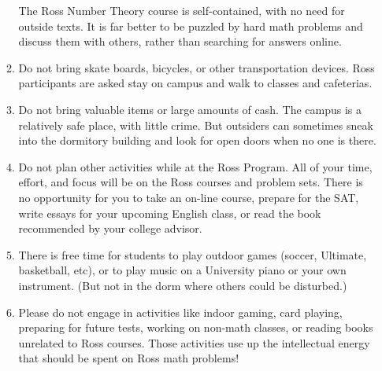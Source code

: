 \documentclass[11pt]{ross}
\begin{document}
\begin{enumerate}[label=(\arabic*),itemsep=2em,topsep=-1em]
\begin{enumerate}[label=(\alph*),itemsep=0.5em,topsep=0em]
    The Ross Number Theory course is self-contained, with no need for 
    outside texts.  It is far better to be puzzled by hard math problems 
    and discuss them with others, rather than searching for answers online.
  \item Do not bring skate boards, bicycles, or other transportation devices.
    Ross participants are asked stay on campus and walk to classes and cafeterias. 
  \item Do not bring valuable items or large amounts of cash.  The
    campus is a relatively safe place, with little crime.  But
    outsiders can sometimes sneak into the dormitory building and look
    for open doors when no one is there.
  \item Do not plan other activities while at the Ross Program. All of 
    your time, effort, and focus will be on the Ross courses and problem 
    sets.  There is no opportunity for you to take an on-line course, 
    prepare for the SAT, write essays for your upcoming English 
    class, or read the book recommended by your college advisor.
  \item There is free time for students to play outdoor games (soccer, Ultimate, 
    basketball, etc), or to play music on a University piano or your own 
    instrument. (But not in the dorm where others could be disturbed.)
   \item Please do not engage in activities like indoor gaming, card playing, 
    preparing for future tests, working on non-math classes, or reading books 
    unrelated to Ross courses. Those activities use up
    the intellectual energy that should be spent on Ross math problems!
\end{enumerate}
\end{enumerate}
\end{document}
